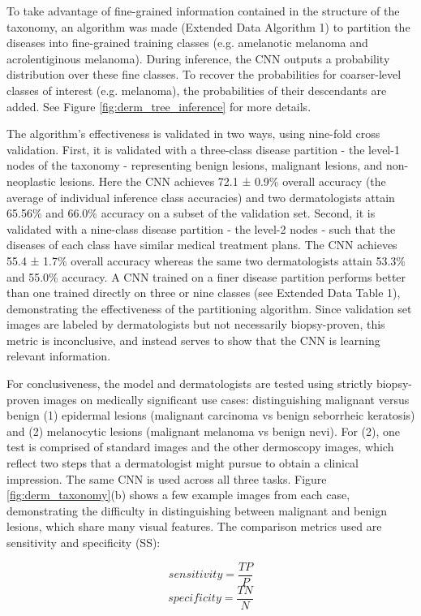 To take advantage of fine-grained information contained in the structure of the taxonomy, an algorithm was made (Extended Data Algorithm 1) to partition the diseases into fine-grained training classes (e.g. amelanotic melanoma and acrolentiginous melanoma). During inference, the CNN outputs a probability distribution over these fine classes. To recover the probabilities for coarser-level classes of interest (e.g. melanoma), the probabilities of their descendants are added. See Figure \ref{fig:derm_tree_inference} for more details.

The algorithm’s effectiveness is validated in two ways, using nine-fold cross validation. First, it is validated with a three-class disease partition - the level-1 nodes of the taxonomy - representing benign lesions, malignant lesions, and non-neoplastic lesions. Here the CNN achieves 72.1 ± 0.9\% overall accuracy (the average of individual inference class accuracies) and two dermatologists attain 65.56\% and 66.0\% accuracy on a subset of the validation set. Second, it is validated with a nine-class disease partition - the level-2 nodes - such that the diseases of each class have similar medical treatment plans. The CNN achieves 55.4 ± 1.7\% overall accuracy whereas the same two dermatologists attain 53.3\% and 55.0\% accuracy. A CNN trained on a finer disease partition performs better than one trained directly on three or nine classes (see Extended Data Table 1), demonstrating the effectiveness of the partitioning algorithm. Since validation set images are labeled by dermatologists but not necessarily biopsy-proven, this metric is inconclusive, and instead serves to show that the CNN is learning relevant information.

For conclusiveness, the model and dermatologists are tested using strictly biopsy-proven images on medically significant use cases: distinguishing malignant versus benign (1) epidermal lesions (malignant carcinoma vs benign seborrheic keratosis) and (2) melanocytic lesions (malignant melanoma vs benign nevi). For (2), one test is comprised of standard images and the other dermoscopy images, which reflect two steps that a dermatologist might pursue to obtain a clinical impression. The same CNN is used across all three tasks. Figure \ref{fig:derm_taxonomy}(b) shows a few example images from each case, demonstrating the difficulty in distinguishing between malignant and benign lesions, which share many visual features. The comparison metrics used are sensitivity and specificity (SS):

$$sensitivity = \frac{TP}{P}$$
$$specificity = \frac{TN}{N}$$

